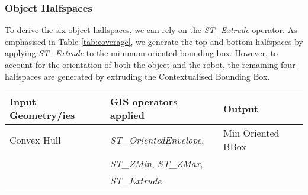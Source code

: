\documentclass{article}
\begin{document}
\subsubsection{Object Halfspaces} To derive the six object halfspaces, we can rely on the  \textit{ST\_Extrude} operator. %
As emphasised in Table \ref{tab:coverage}, we generate the top and bottom halfspaces by applying \textit{ST\_Extrude} to the minimum oriented bounding box. However, to account for the orientation of both the object and the robot, the remaining four halfspaces are generated by extruding the Contextualised Bounding Box.    
\begin{table*}[t]
    \begin{subtable}[t]{0.45\textwidth}
        \centering
        \begin{tabular}{l | l | l}
        \textbf{Input Geometry/ies} & \textbf{GIS operators applied} & \textbf{Output} \\
        \midrule
        Convex Hull & \textit{ST\_OrientedEnvelope}, & Min Oriented BBox  \\ 
        & \textit{ST\_ZMin}, \textit{ST\_ZMax}, & \\ 
       & \textit{ST\_Extrude} & \\ \hline
       

\end{tabular}
\end{subtable}
\end{table*}
\end{document}
